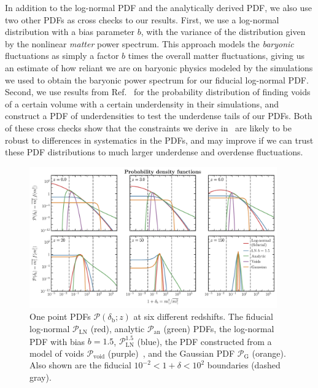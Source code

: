 \documentclass[prd,aps,10pt,nofootinbib,twocolumn,superscriptaddress,preprintnumbers,balancelastpage,longbibliography]{revtex4-1}
\begin{document}
In addition to the log-normal PDF and the analytically derived PDF, we also use two other PDFs as cross checks to our results. 
First, we use a log-normal distribution with a bias parameter $b$, with the variance of the distribution given by the nonlinear \textit{matter} power spectrum. 
This approach models the \textit{baryonic} fluctuations as simply a factor $b$ times the overall matter fluctuations, giving us an estimate of how reliant we are on baryonic physics modeled by the simulations we used to obtain the baryonic power spectrum for our fiducial log-normal PDF\@. 
Second, we use results from Ref.~\cite{Adermann:2018jba} for the probability distribution of finding voids of a certain volume with a certain underdensity in their simulations, and construct a PDF of underdensities to test the underdense tails of our PDFs. 
Both of these cross checks show that the constraints we derive in~ are likely to be robust to differences in systematics in the PDFs, and may improve if we can trust these PDF distributions to much larger underdense and overdense fluctuations. 
%
\begin{figure}[htbp]
    \centering
    \includegraphics[width=0.95\textwidth]{plots/PDFs_at_diff_z}
    \caption{One point PDFs $\mathcal{P}(\delta_\text{b}; z)$ at six different redshifts. The fiducial log-normal $\mathcal{P}_\text{LN}$ (red), analytic $\mathcal{P}_\text{an}$ (green) PDFs, the log-normal PDF with bias $b = 1.5$, $\mathcal{P}_\text{LN}^{1.5}$ (blue), the PDF constructed from a model of voids $\mathcal{P}_\text{void}$ (purple)~\cite{Adermann:2018jba}, and the Gaussian PDF $\mathcal{P}_\text{G}$ (orange). Also shown are the fiducial $10^{-2} < 1+\delta < 10^2$ boundaries (dashed gray).~} 
    \label{fig:PDFs}
\end{figure}
%
\end{document}
